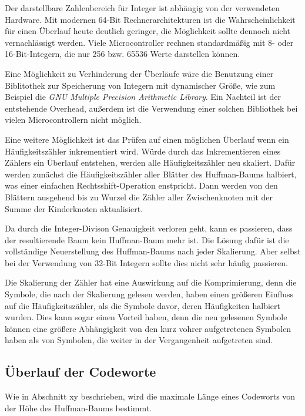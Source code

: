 \documentclass[twoside,11pt,a4paper]{article}
\theoremstyle{break}
\begin{document}
Der darstellbare Zahlenbereich für Integer ist abhängig von der
verwendeten Hardware. Mit modernen 64-Bit Rechnerarchitekturen ist die
Wahrscheinlichkeit für einen Überlauf heute deutlich geringer, die
Möglichkeit sollte dennoch nicht vernachlässigt werden. Viele
Microcontroller rechnen standardmäßig mit 8- oder 16-Bit-Integern, die
nur 256 bzw. 65536 Werte darstellen können.

Eine Möglichkeit zu Verhinderung der Überläufe wäre die Benutzung
einer Biblitothek zur Speicherung von Integern mit dynamischer Größe,
wie zum Beispiel die \emph{GNU Multiple Precision Arithmetic
  Library}. Ein Nachteil ist der entstehende Overhead, außerdem ist
die Verwendung einer solchen Bibliothek bei vielen Microcontrollern
nicht möglich. \cite{GMP}

Eine weitere Möglichkeit ist das Prüfen auf einen möglichen Überlauf
wenn ein Häufigkeitszähler inkrementiert wird. Würde durch das
Inkrementieren eines Zählers ein Überlauf entstehen, werden alle
Häufigkeitszähler neu skaliert. Dafür werden zunächst die
Häufigkeitszähler aller Blätter des Huffman-Baums halbiert, was einer
einfachen Rechtsshift-Operation enstpricht. Dann werden von den
Blättern ausgehend bis zu Wurzel die Zähler aller Zwischenknoten mit
der Summe der Kinderknoten aktualisiert.

Da durch die Integer-Divison Genauigkeit verloren geht, kann es
passieren, dass der resultierende Baum kein Huffman-Baum mehr ist. Die
Lösung dafür ist die vollständige Neuerstellung des Huffman-Baums nach
jeder Skalierung. Aber selbst bei der Verwendung von 32-Bit Integern
sollte dies nicht sehr häufig passieren.


Die Skalierung der Zähler hat eine Auswirkung auf die Komprimierung,
denn die Symbole, die nach der Skalierung gelesen werden, haben einen
größeren Einfluss auf die Häufigkeitszähler, als die Symbole davor,
deren Häufigkeiten halbiert wurden. Dies kann sogar einen Vorteil
haben, denn die neu gelesenen Symbole können eine größere Abhängigkeit
von den kurz vohrer aufgetretenen Symbolen haben als von Symbolen, die
weiter in der Vergangenheit aufgetreten sind.

\subsection{Überlauf der Codeworte}
Wie in Abschnitt xy beschrieben, wird die maximale Länge eines
Codeworts von der Höhe des Huffman-Baums bestimmt.
\end{document}
